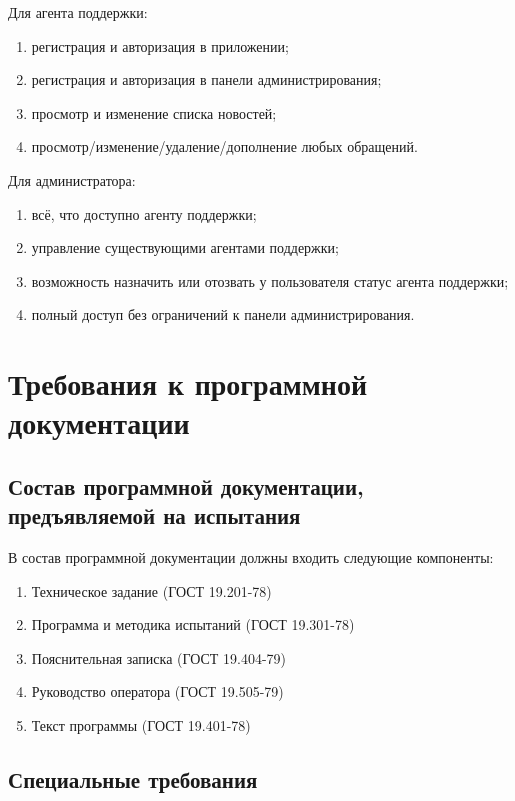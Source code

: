 \documentclass{../includes/TechDoc}
\begin{document}
    Для агента поддержки:
    \begin{enumerate}[noitemsep]
        \item регистрация и авторизация в приложении;
        \item регистрация и авторизация в панели администрирования;
        \item просмотр и изменение списка новостей;
        \item просмотр/изменение/удаление/дополнение любых обращений.
    \end{enumerate}

    Для администратора:
    \begin{enumerate}[noitemsep]
        \item всё, что доступно агенту поддержки;
        \item управление существующими агентами поддержки;
        \item возможность назначить или отозвать у пользователя статус агента поддержки;
        \item полный доступ без ограничений к панели администрирования.
    \end{enumerate}


    \section{Требования к программной документации}

    \subsection{Состав программной документации, предъявляемой на испытания}

    В состав программной документации должны входить следующие компоненты:
    \begin{enumerate}
        \item Техническое задание (ГОСТ 19.201-78)
        \item Программа и методика испытаний (ГОСТ 19.301-78)
        \item Пояснительная записка (ГОСТ 19.404-79)
        \item Руководство оператора (ГОСТ 19.505-79)
        \item Текст программы (ГОСТ 19.401-78)
    \end{enumerate}

    \subsection{Специальные требования}
\end{document}
